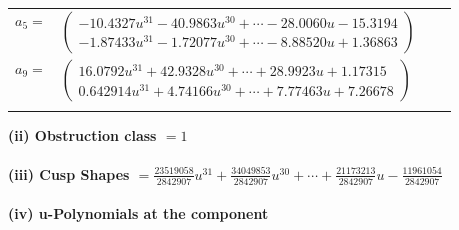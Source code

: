 \documentclass[1p]{elsarticle_modified}
\theoremstyle{definition}
\begin{document}
\begin{tabular}{m{7pt} m{180pt} m{7pt} m{180pt} }
\flushright $a_{5}=$&$\begin{pmatrix}-10.4327 u^{31}-40.9863 u^{30}+\cdots-28.0060 u-15.3194\\-1.87433 u^{31}-1.72077 u^{30}+\cdots-8.88520 u+1.36863\end{pmatrix}$ \\
\flushright $a_{9}=$&$\begin{pmatrix}16.0792 u^{31}+42.9328 u^{30}+\cdots+28.9923 u+1.17315\\0.642914 u^{31}+4.74166 u^{30}+\cdots+7.77463 u+7.26678\end{pmatrix}$\\&\end{tabular}
\flushleft \textbf{(ii) Obstruction class $= 1$}\\~\\
\flushleft \textbf{(iii) Cusp Shapes $= \frac{23519058}{2842907} u^{31}+\frac{34049853}{2842907} u^{30}+\cdots+\frac{21173213}{2842907} u-\frac{11961054}{2842907}$}\\~\\
\newpage\renewcommand{\arraystretch}{1}
\flushleft \textbf{(iv) u-Polynomials at the component}\newline \\
\end{document}
